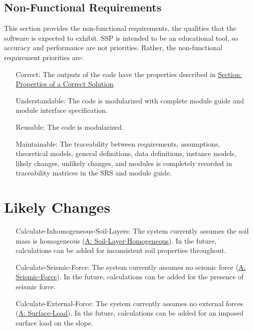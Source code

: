\documentclass[12pt]{article}
\begin{document}
\subsection{Non-Functional Requirements}
\label{Sec:NFRs}
This section provides the non-functional requirements, the qualities that the software is expected to exhibit.
SSP is intended to be an educational tool, so accuracy and performance are not priorities. Rather, the non-functional requirement priorities are:
\begin{itemize}
\item[Correct:\phantomsection\label{correct}]The outputs of the code have the properties described in \hyperref[Sec:CorSolProps]{Section: Properties of a Correct Solution}.
\item[Understandable:\phantomsection\label{understandable}]The code is modularized with complete module guide and module interface specification.
\item[Reusable:\phantomsection\label{reusable}]The code is modularized.
\item[Maintainable:\phantomsection\label{maintainable}]The traceability between requirements, assumptions, theoretical models, general definitions, data definitions, instance models, likely changes, unlikely changes, and modules is completely recorded in traceability matrices in the SRS and module guide.
\end{itemize}
\section{Likely Changes}
\label{Sec:LCs}
\begin{itemize}
\item[Calculate-Inhomogeneous-Soil-Layers:\phantomsection\label{LC_inhomogeneous}]The system currently assumes the soil mass is homogeneous (\hyperref[assumpSLH]{A: Soil-Layer-Homogeneous}). In the future, calculations can be added for inconsistent soil properties throughout.
\item[Calculate-Seismic-Force:\phantomsection\label{LC_seismic}]The system currently assumes no seismic force (\hyperref[assumpSF]{A: Seismic-Force}). In the future, calculations can be added for the presence of seismic force.
\item[Calculate-External-Force:\phantomsection\label{LC_external}]The system currently assumes no external forces (\hyperref[assumpSL]{A: Surface-Load}). In the future, calculations can be added for an imposed surface load on the slope.
\end{itemize}
\end{document}
